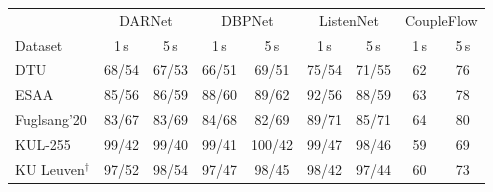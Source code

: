\begin{tabular}{lcccccc|cc}\toprule
 & \multicolumn{2}{c}{DARNet} & \multicolumn{2}{c}{DBPNet} & \multicolumn{2}{c}{ListenNet} & \multicolumn{2}{c}{CoupleFlow} \\
Dataset & 1\,s & 5\,s & 1\,s & 5\,s & 1\,s & 5\,s & 1\,s & 5\,s \\\midrule
DTU & 68/54 & 67/53 & 66/51 & 69/51 & 75/54 & 71/55 & 62 & 76 \\
ESAA & 85/56 & 86/59 & 88/60 & 89/62 & 92/56 & 88/59 & 63 & 78 \\
Fuglsang'20 & 83/67 & 83/69 & 84/68 & 82/69 & 89/71 & 85/71 & 64 & 80 \\
KUL-255 & 99/42 & 99/40 & 99/41 & 100/42 & 99/47 & 98/46 & 59 & 69 \\
KU Leuven$^\dagger$ & 97/52 & 98/54 & 97/47 & 98/45 & 98/42 & 97/44 & 60 & 73 \\
\bottomrule\end{tabular}
